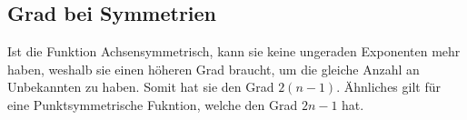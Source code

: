 \documentclass{article}
\begin{document}
\subsection{Grad bei Symmetrien} 
Ist die Funktion Achsensymmetrisch, kann sie keine ungeraden Exponenten mehr haben, weshalb sie einen höheren Grad braucht, um die gleiche Anzahl an Unbekannten zu haben. Somit hat sie den Grad $2(n-1)$. \newline
Ähnliches gilt für eine Punktsymmetrische Fukntion, welche den Grad $2n-1$ hat.
\end{document}
